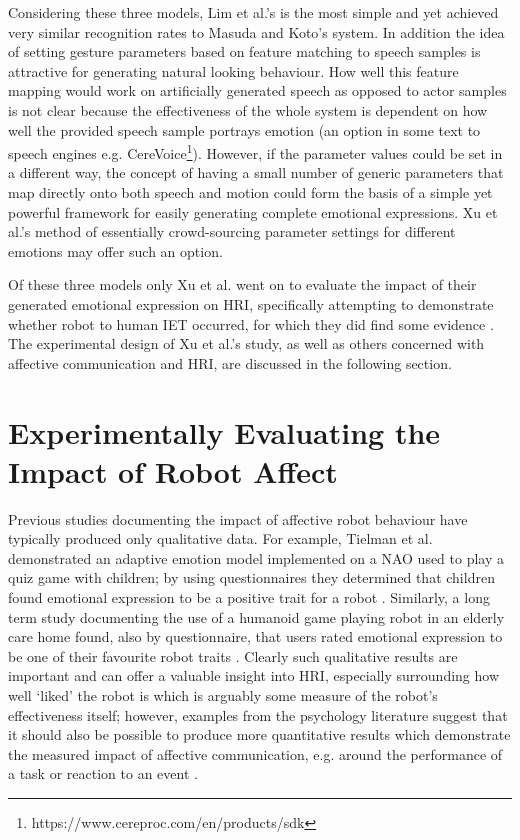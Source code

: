 \documentclass[11pt,a4paper]{report}
\begin{document}
Considering these three models, Lim et al.'s is the most simple and yet achieved very similar recognition rates to Masuda and Koto's system. In addition the idea of setting gesture parameters based on feature matching to speech samples is attractive for generating natural looking behaviour. How well this feature mapping would work on artificially generated speech as opposed to actor samples is not clear because the effectiveness of the whole system is dependent on how well the provided speech sample portrays emotion (an option in some text to speech engines e.g. CereVoice\footnote{https://www.cereproc.com/en/products/sdk}). However, if the parameter values could be set in a different way, the concept of having a small number of generic parameters that map directly onto both speech and motion could form the basis of a simple yet powerful framework for easily generating complete emotional expressions. Xu et al.'s method of essentially crowd-sourcing parameter settings for different emotions may offer such an option. 

Of these three models only Xu et al. went on to evaluate the impact of their generated emotional expression on HRI, specifically attempting to demonstrate whether robot to human IET occurred, for which they did find some evidence \cite{xu2014robot}. The experimental design of Xu et al.'s study, as well as others concerned with affective communication and HRI, are discussed in the following section.

\section{Experimentally Evaluating the Impact of Robot Affect}

Previous studies documenting the impact of affective robot behaviour have typically produced only qualitative data. For example, Tielman et al. demonstrated an adaptive emotion model implemented on a NAO used to play a quiz game with children; by using questionnaires they determined that children found emotional expression to be a positive trait for a robot \cite{tielman2014adaptive}. Similarly, a long term study documenting the use of a humanoid game playing robot in an elderly care home found, also by questionnaire, that users rated emotional expression to be one of their favourite robot traits \cite{louie2012playing}. Clearly such qualitative results are important and can offer a valuable insight into HRI, especially surrounding how well `liked' the robot is which is arguably some measure of the robot's effectiveness itself; however, examples from the psychology literature suggest that it should also be possible to produce more quantitative results which demonstrate the measured impact of affective communication, e.g. around the performance of a task \cite{barsade2002ripple} or reaction to an event \cite{latane1968group}.
\end{document}
